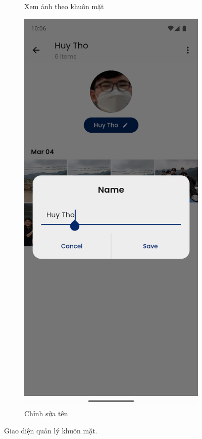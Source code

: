 \begin{figure}[H]
\begin{subfigure}{0.32\textwidth}
        \caption{Xem ảnh theo khuôn mặt}
    \end{subfigure}
    \hfill
    \begin{subfigure}{0.32\textwidth}
        \includegraphics[width=1\linewidth]{figures/c4/4-2/face_3.png} 
        \caption{Chỉnh sửa tên}
    \end{subfigure}
    \caption{Giao diện quản lý khuôn mặt.}
    \label{fig:explore_face}
\end{figure}